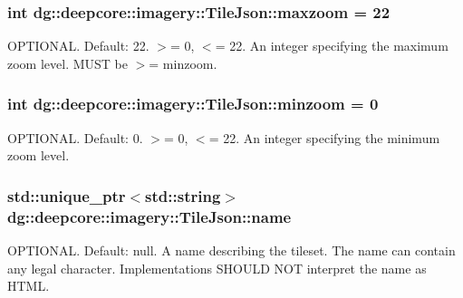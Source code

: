 \subsubsection[{\texorpdfstring{maxzoom}{maxzoom}}]{\setlength{\rightskip}{0pt plus 5cm}int dg\+::deepcore\+::imagery\+::\+Tile\+Json\+::maxzoom = 22}\hypertarget{structdg_1_1deepcore_1_1imagery_1_1_tile_json_a8f32c4c1ca4750f301ed39ce8d3c19f5}{}\label{structdg_1_1deepcore_1_1imagery_1_1_tile_json_a8f32c4c1ca4750f301ed39ce8d3c19f5}
O\+P\+T\+I\+O\+N\+AL. Default\+: 22. $>$= 0, $<$= 22. An integer specifying the maximum zoom level. M\+U\+ST be $>$= minzoom. 
\subsubsection[{\texorpdfstring{minzoom}{minzoom}}]{\setlength{\rightskip}{0pt plus 5cm}int dg\+::deepcore\+::imagery\+::\+Tile\+Json\+::minzoom = 0}\hypertarget{structdg_1_1deepcore_1_1imagery_1_1_tile_json_a77756c09c221095697741311a6a6ee50}{}\label{structdg_1_1deepcore_1_1imagery_1_1_tile_json_a77756c09c221095697741311a6a6ee50}
O\+P\+T\+I\+O\+N\+AL. Default\+: 0. $>$= 0, $<$= 22. An integer specifying the minimum zoom level. 
\subsubsection[{\texorpdfstring{name}{name}}]{\setlength{\rightskip}{0pt plus 5cm}std\+::unique\+\_\+ptr$<$std\+::string$>$ dg\+::deepcore\+::imagery\+::\+Tile\+Json\+::name}\hypertarget{structdg_1_1deepcore_1_1imagery_1_1_tile_json_a5e1cb3591fa0d3c15184869d90bf42f9}{}\label{structdg_1_1deepcore_1_1imagery_1_1_tile_json_a5e1cb3591fa0d3c15184869d90bf42f9}
O\+P\+T\+I\+O\+N\+AL. Default\+: null. A name describing the tileset. The name can contain any legal character. Implementations S\+H\+O\+U\+LD N\+OT interpret the name as H\+T\+ML. 
